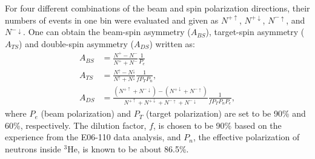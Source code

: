  For four different combinations of the beam and spin polarization directions, their numbers of events in one bin were evaluated and given as $N^{+\uparrow}$, $N^{+\downarrow}$, $N^{-\uparrow}$, and $N^{-\downarrow}$. One can obtain the beam-spin asymmetry ($A_{BS}$), target-spin asymmetry ($A_{TS}$) and double-spin asymmetry ($A_{DS}$) written as:
     \begin{align}
            A_{BS} &= \frac{N^{+}-N^{-}}{N^{+}+N^{-}}\frac{1}{P_{e}}\\
        A_{TS} &= \frac{N^{\uparrow}-N^{\downarrow}}{N^{\uparrow}+N^{\downarrow}}\frac{1}{f P_{T} P_{n}},\\   
        A_{DS} &= \frac{(N^{+\uparrow}+N^{-\downarrow})-(N^{+\downarrow}+N^{-\uparrow})}{N^{+\uparrow}+N^{+\downarrow}+N^{-\uparrow}+N^{-\downarrow}}\frac{1}{f P_{T} P_{n} P_{e}},
%                   
     \end{align}
where $P_{e}$ (beam polarization) and $P_{T}$ (target polarization) are set to be 90\% and 60\%, respectively. The dilution factor, $f$, is chosen to be 90\% based on the experience from the E06-110 data analysis, and $P_{n}$, the effective polarization of neutrons inside $\mathrm{^{3}He}$, is known to be about 86.5\%. 

